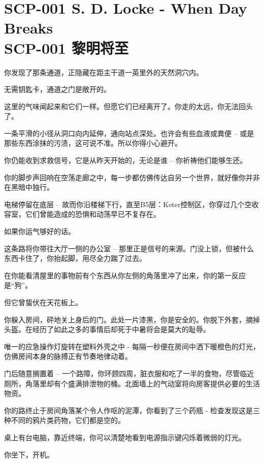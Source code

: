 \chapter[SCP-001 黎明将至]{
	SCP-001 S. D. Locke - When Day Breaks \\
	SCP-001 黎明将至
}

\label{chap:SCP-001.when.day.breaks}

\begin{scpbox}

你发现了那条通道，正隐藏在距主干道一英里外的天然洞穴内。

无需钥匙卡，通道之门是敞开的。

这里的气味闻起来和它们一样。但愿它们已经离开了。你走的太远，你无法回头了。

一条平滑的小径从洞口向内延伸，通向站点深处。也许会有些血液或粪便 – 或是那些东西涂抹的污渍，这可说不准。所以你得小心避开。

你仍能收到求救信号，它是从昨天开始的，无论是谁 – 你祈祷他们能够生还。

你的脚步声回响在空荡走廊之中，每一步都仿佛传达自另一个世界，就好像你并非在黑暗中独行。

电梯停留在底层 – 故而你沿楼梯下行，直至B5层：Keter控制区，你穿过几个空收容室，它们曾能造成的恐惧和动荡早已不复存在。

如果你运气够好的话。

这条路将你带往大厅一侧的办公室 – 那里正是信号的来源。门没上锁，但被什么东西卡住了，你抬起脚，用尽全力踹了过去。

在你能看清屋里的事物前有个东西从你左侧的角落里冲了出来，你的第一反应是“狗”。

但它曾蛰伏在天花板上。

你躲入房间，砰地关上身后的门。此处一片漆黑，你是安全的。你脱下外套，摘掉头盔。在经历了如此之多的事情后却死于中暑将会是莫大的耻辱。

唯一的应急操作灯旋转在塑料外壳之中 - 每隔一秒便在房间中洒下暖橙色的灯光，仿佛房间本身的脉搏正有节奏地律动着。

门后随意搁置着 – 一个路障，你环顾四周，脏衣服和吃了一半的食物，尽管临近厕所，角落里却有个盛满排泄物的桶。北面墙上的气动室将向房客提供必要的生活物资。

你的路终止于房间角落某个令人作呕的泥潭，你看到了三个药瓶 - 检查发现这是三种不同的鸦片类药物，它们都是空的。

桌上有台电脑，靠近终端，你可以清楚地看到电源指示键闪烁着微弱的灯光。

你坐下，开机。

\end{scpbox}

